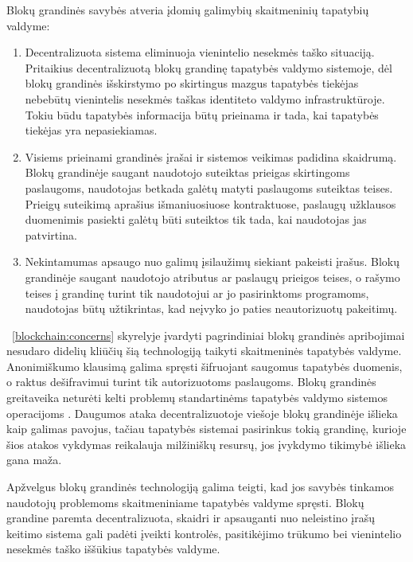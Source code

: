 Blokų grandinės savybės atveria įdomių galimybių skaitmeninių tapatybių valdyme:

\begin{enumerate}
    \item Decentralizuota sistema eliminuoja vienintelio nesekmės taško situaciją. Pritaikius decentralizuotą blokų grandinę
    tapatybės valdymo sistemoje, dėl blokų grandinės išskirstymo po skirtingus mazgus 
    tapatybės tiekėjas nebebūtų vienintelis nesekmės taškas identiteto valdymo infrastruktūroje. Tokiu būdu tapatybės informacija būtų prieinama ir tada,
    kai tapatybės tiekėjas yra nepasiekiamas.

    \item Visiems prieinami grandinės įrašai ir sistemos veikimas padidina skaidrumą. Blokų grandinėje saugant naudotojo suteiktas prieigas skirtingoms paslaugoms,
    naudotojas betkada galėtų matyti paslaugoms suteiktas teises. Prieigų suteikimą aprašius išmaniuosiuose kontraktuose, paslaugų užklausos duomenimis
    pasiekti galėtų būti suteiktos tik tada, kai naudotojas jas patvirtina.

    \item Nekintamumas apsaugo nuo galimų įsilaužimų siekiant pakeisti įrašus.
    Blokų grandinėje saugant naudotojo atributus ar paslaugų prieigos teises,
    o rašymo teises į grandinę turint tik naudotojui ar jo pasirinktoms programoms, naudotojas būtų užtikrintas, kad
    neįvyko jo paties neautorizuotų pakeitimų.

\end{enumerate}

~\ref{blockchain:concerns} skyrelyje įvardyti pagrindiniai blokų grandinės apribojimai nesudaro didelių kliūčių šią technologiją taikyti skaitmeninės tapatybės valdyme.  Anonimiškumo klausimą galima spręsti šifruojant saugomus tapatybės duomenis,
o raktus dešifravimui turint tik autorizuotoms paslaugoms. Blokų grandinės greitaveika neturėti kelti problemų
standartinėms tapatybės valdymo sistemos operacijoms \cite{Lo2017}. Daugumos ataka decentralizuotoje viešoje blokų grandinėje išlieka kaip galimas pavojus,
tačiau tapatybės sistemai pasirinkus tokią grandinę, kurioje šios atakos vykdymas reikalauja milžiniškų resursų, jos įvykdymo tikimybė išlieka gana maža.

Apžvelgus blokų grandinės technologiją galima teigti, kad jos savybės tinkamos naudotojų problemoms skaitmeniniame tapatybės
valdyme spręsti. Blokų grandine paremta decentralizuota, skaidri ir apsauganti nuo neleistino įrašų keitimo sistema gali padėti
įveikti kontrolės, pasitikėjimo trūkumo bei vienintelio nesekmės taško iššūkius tapatybės valdyme.

